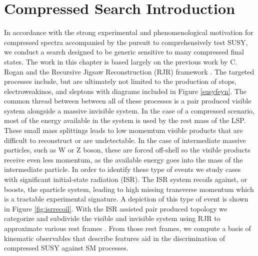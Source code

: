 \section{Compressed Search Introduction}
In accordance with the strong experimental and phenomenological motivation for compressed spectra accompanied by the pursuit to comprehensively test SUSY, we conduct a search designed to be generic sensitive to many compressed final states. The work in this chapter is based largely on the previous work by C. Rogan and the Recursive Jigsaw Reconstruction (RJR) framework \cite{AN}. The targeted processes include, but are ultimately not limited to the production of stops, electroweakinos, and sleptons with diagrams included in Figure \ref{susyfeyn}.  
The common thread between between all of these processes is a pair produced visible system alongside a massive invisible system. In the case of a compressed scenario, most of the energy available in the system is used by the rest mass of the LSP. These small mass splittings leads to low momemtum visible products that are difficult to reconstruct or are undetectable. In the case of intermediate massive particles, such as W or Z boson, these are forced off-shell so the visible products receive even less momentum, as the available energy goes into the mass of the intermediate particle. In order to identify these type of events we study cases with significant initial-state radiation (ISR). The ISR system recoils against, or boosts, the sparticle system, leading to high missing transverse momentum which is a tractable experimental signature. A depiction of this type of event is shown in Figure \ref{fig:isrrecoil}. With the ISR assisted pair produced topology we categorize and subdivide the visible and invisible system using RJR to approximate various rest frames \cite{PhysRevD.96.112007}. From those rest frames, we compute a basis of kinematic observables that describe features aid in the discrimination of compressed SUSY against SM processes.

